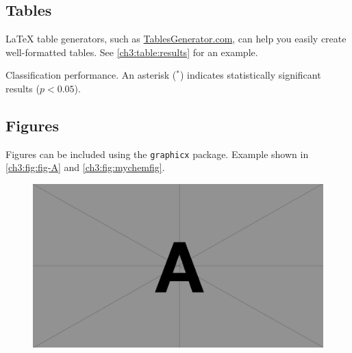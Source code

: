 \subsection{Tables}
\begin{subparagraph}
{\LaTeX} table generators, such as \href{https://www.tablesgenerator.com/}{TablesGenerator.com}, can help you easily create well-formatted tables. See \autoref{ch3:table:results} for an example.
\end{subparagraph}

\begin{table}[ht]
\caption{Classification performance. An asterisk ($^*$) indicates statistically significant results ($p<0.05$).}
\label{ch3:table:results}
\centering
\normalsize\singlespacingplus

\end{table}

\subsection{Figures}
\begin{subparagraph}
Figures can be included using the \texttt{graphicx} package. Example shown in \autoref{ch3:fig:fig-A} and \autoref{ch3:fig:mychemfig}.
\end{subparagraph}

\begin{figure}[ht]
    \centering
    \includegraphics[width=1\columnwidth]{figures/ch3/A.pdf}
    \label{ch3:fig:fig-A}
\end{figure}

